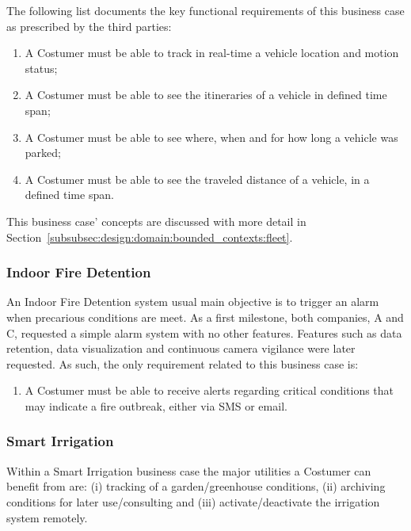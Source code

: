 The following list documents the key functional requirements of this business case as prescribed by the third parties:

\begin{enumerate}
    \item A Costumer must be able to track in real-time a vehicle location and motion status;
    \item A Costumer must be able to see the itineraries of a vehicle in defined time span;
    \item A Costumer must be able to see where, when and for how long a vehicle was parked;
    \item A Costumer must be able to see the traveled distance of a vehicle, in a defined time span.
\end{enumerate}

This business case' concepts are discussed with more detail in Section~\ref{subsubsec:design:domain:bounded_contexts:fleet}.

\subsubsection{Indoor Fire Detention}
\label{subsubsec:requirements:functional:services:fire}

An Indoor Fire Detention system usual main objective is to trigger an alarm when precarious conditions are meet. As a first milestone, both companies, A and C, requested a simple alarm system with no other features. Features such as data retention, data visualization and continuous camera vigilance were later requested. As such, the only requirement related to this business case is:

\begin{enumerate}
    \item A Costumer must be able to receive alerts regarding critical conditions that may indicate a fire outbreak, either via SMS or email.
\end{enumerate}

\subsubsection{Smart Irrigation}
\label{subsubsec:requirements:functional:services:irrigation}

Within a Smart Irrigation business case the major utilities a Costumer can benefit from are: (i) tracking of a garden/greenhouse conditions, (ii) archiving conditions for later use/consulting and (iii) activate/deactivate the irrigation system remotely.

